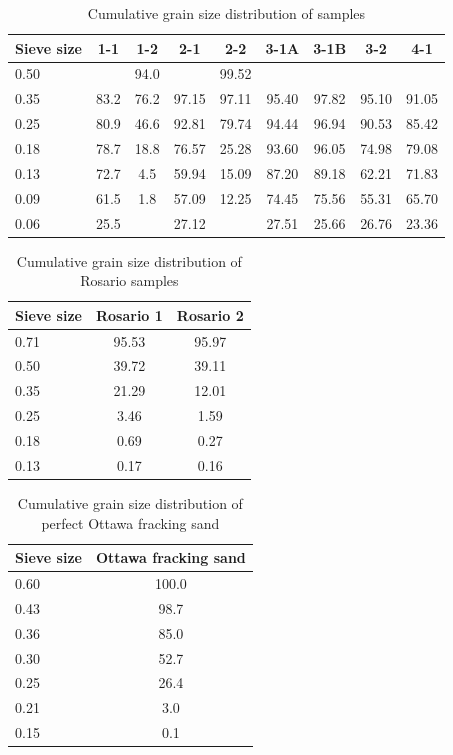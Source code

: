 \begin{table}[H]
\centering
\label{tab:Cgzd}
\begin{tabular}{lcccccccc}
\toprule
\textbf{Sieve size} & \textbf{1-1} & \textbf{1-2} & \textbf{2-1} & \textbf{2-2} & \textbf{3-1A} & \textbf{3-1B} & \textbf{3-2} & \textbf{4-1}\\
\midrule
0.50    &      & 94.0 &       & 99.52 &       &       &       &       \\
0.35    & 83.2 & 76.2 & 97.15 & 97.11 & 95.40 & 97.82 & 95.10 & 91.05 \\
0.25    & 80.9 & 46.6 & 92.81 & 79.74 & 94.44 & 96.94 & 90.53 & 85.42 \\
0.18    & 78.7 & 18.8 & 76.57 & 25.28 & 93.60 & 96.05 & 74.98 & 79.08 \\
0.13    & 72.7 & 4.5  & 59.94 & 15.09 & 87.20 & 89.18 & 62.21 & 71.83 \\
0.09    & 61.5 & 1.8  & 57.09 & 12.25 & 74.45 & 75.56 & 55.31 & 65.70 \\
0.06    & 25.5 &      & 27.12 &       & 27.51 & 25.66 & 26.76 & 23.36 \\
\bottomrule
\end{tabular}
\caption{Cumulative grain size distribution of samples}
\end{table}

\begin{table}[H]
\centering
\label{tab:Cgzd}
\begin{tabular}{lcc}
\toprule
\textbf{Sieve size} & \textbf{Rosario 1} & \textbf{Rosario 2} \\
\midrule
0.71 & 95.53 & 95.97 \\
0.50 & 39.72 & 39.11 \\ 
0.35 & 21.29 & 12.01 \\
0.25 & 3.46  & 1.59  \\ 
0.18 & 0.69  & 0.27  \\ 
0.13 & 0.17  & 0.16  \\
\bottomrule
\end{tabular}
\caption{Cumulative grain size distribution of Rosario samples}
\end{table}

\begin{table}[H]
\centering
\label{tab:Cgzd}
\begin{tabular}{lc}
\toprule
\textbf{Sieve size} & \textbf{Ottawa fracking sand} \\
\midrule
0.60 & 100.0\\
0.43 & 98.7 \\ 
0.36 & 85.0 \\
0.30 & 52.7 \\ 
0.25 & 26.4 \\ 
0.21 & 3.0  \\
0.15 & 0.1  \\
\bottomrule
\end{tabular}
\caption{Cumulative grain size distribution of perfect Ottawa fracking sand \autocite{.....}}
\end{table}


